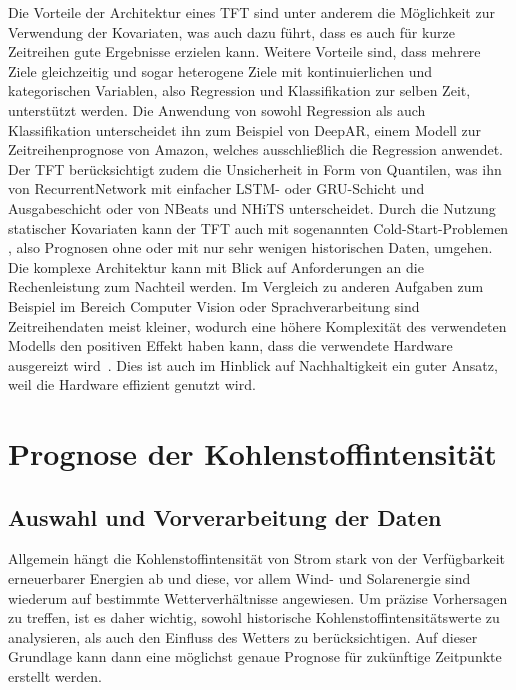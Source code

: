 Die Vorteile der Architektur eines \ac{TFT} sind unter anderem die Möglichkeit zur Verwendung der Kovariaten, was auch dazu führt, dass es auch für kurze Zeitreihen gute Ergebnisse erzielen kann.
Weitere Vorteile sind, dass mehrere Ziele gleichzeitig und sogar heterogene Ziele mit kontinuierlichen und kategorischen Variablen, also Regression und Klassifikation zur selben Zeit, unterstützt werden.
Die Anwendung von sowohl Regression als auch Klassifikation unterscheidet ihn zum Beispiel von DeepAR, einem Modell zur Zeitreihenprognose von Amazon, welches ausschließlich die Regression anwendet.
Der \ac{TFT} berücksichtigt zudem die Unsicherheit in Form von Quantilen, was ihn von RecurrentNetwork mit einfacher \ac{LSTM}- oder \ac{GRU}-Schicht und Ausgabeschicht oder von NBeats und NHiTS unterscheidet.
Durch die Nutzung statischer Kovariaten kann der \ac{TFT} auch mit sogenannten \glqq Cold-Start-Problemen \grqq{}, also Prognosen ohne oder mit nur sehr wenigen historischen Daten, umgehen.
Die komplexe Architektur kann mit Blick auf Anforderungen an die Rechenleistung zum Nachteil werden.
Im Vergleich zu anderen Aufgaben zum Beispiel im Bereich Computer Vision oder Sprachverarbeitung sind Zeitreihendaten meist kleiner, wodurch eine höhere Komplexität des verwendeten Modells den positiven Effekt haben kann, dass die verwendete Hardware ausgereizt wird~\cite{PytorchForecastingDocumentation.20230410T20:05:43.000Z}.
Dies ist auch im Hinblick auf Nachhaltigkeit ein guter Ansatz, weil die Hardware effizient genutzt wird.
\chapter{Prognose der Kohlenstoffintensität}\label{CAP:prediction}
\section{Auswahl und Vorverarbeitung der Daten}\label{CAP:data-preparation-analysis}
Allgemein hängt die Kohlenstoffintensität von Strom stark von der Verfügbarkeit erneuerbarer Energien ab und diese, vor allem Wind- und Solarenergie sind wiederum auf bestimmte Wetterverhältnisse angewiesen.
Um präzise Vorhersagen zu treffen, ist es daher wichtig, sowohl historische Kohlenstoffintensitätswerte zu analysieren, als auch den Einfluss des Wetters zu berücksichtigen.
Auf dieser Grundlage kann dann eine möglichst genaue Prognose für zukünftige Zeitpunkte erstellt werden.

